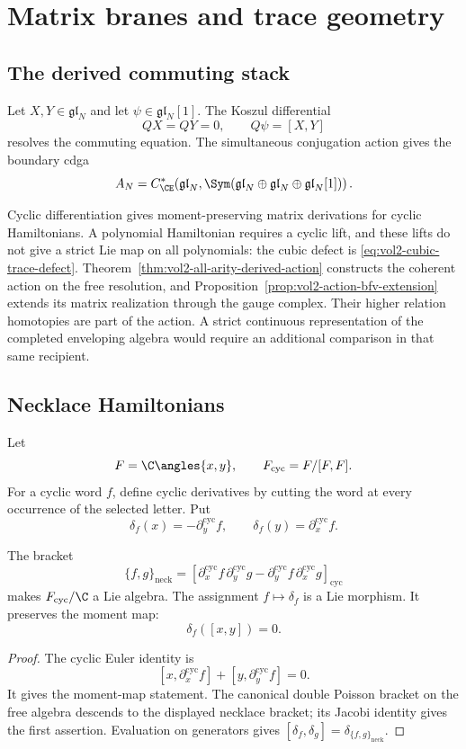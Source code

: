 \part{Matrix branes and trace geometry}

\chapter{The derived commuting stack}
Let $X,Y\in\mathfrak{gl}_N$ and let $\psi\in\mathfrak{gl}_N[1]$.  The Koszul differential
\[
 QX=QY=0,
 \qquad
 Q\psi=[X,Y]
\]
resolves the commuting equation.  The simultaneous conjugation action gives the boundary cdga
\[
 A_N=C^*_{\CE}\!\left(
 \mathfrak{gl}_N,
 \Sym(\mathfrak{gl}_N\oplus\mathfrak{gl}_N\oplus\mathfrak{gl}_N[1])
 \right).
\]

Cyclic differentiation gives moment-preserving matrix derivations for
cyclic Hamiltonians. A polynomial Hamiltonian requires a cyclic lift,
and these lifts do not give a strict Lie map on all polynomials:
the cubic defect is \eqref{eq:vol2-cubic-trace-defect}.
Theorem~\ref{thm:vol2-all-arity-derived-action} constructs the
coherent action on the free resolution, and
Proposition~\ref{prop:vol2-action-bfv-extension} extends its matrix
realization through the gauge complex. Their higher relation
homotopies are part of the action. A strict continuous representation
of the completed enveloping algebra would require an additional
comparison in that same recipient.

\chapter{Necklace Hamiltonians}
Let
\[
 F=\C\angles{x,y},
 \qquad
 F_{\mathrm{cyc}}=F/[F,F].
\]
For a cyclic word $f$, define cyclic derivatives by cutting the word at every occurrence of the selected letter.  Put
\[
 \delta_f(x)=-\partial_y^{\mathrm{cyc}}f,
 \qquad
 \delta_f(y)=\partial_x^{\mathrm{cyc}}f.
\]

\begin{theorem}
The bracket
\[
 \{f,g\}_{\mathrm{neck}}
 =\left[
 \partial_x^{\mathrm{cyc}}f\,
 \partial_y^{\mathrm{cyc}}g-
 \partial_y^{\mathrm{cyc}}f\,
 \partial_x^{\mathrm{cyc}}g
 \right]_{\mathrm{cyc}}
\]
makes $F_{\mathrm{cyc}}/\C$ a Lie algebra.  The assignment $f\mapsto\delta_f$ is a Lie morphism.  It preserves the moment map:
\[
 \delta_f([x,y])=0.
\]
\end{theorem}
\begin{proof}
The cyclic Euler identity is
\[
 [x,\partial_x^{\mathrm{cyc}}f]+[y,\partial_y^{\mathrm{cyc}}f]=0.
\]
It gives the moment-map statement.  The canonical double Poisson bracket on the free algebra descends to the displayed necklace bracket; its Jacobi identity gives the first assertion.  Evaluation on generators gives $[\delta_f,\delta_g]=\delta_{\{f,g\}_{\mathrm{neck}}}$.
\end{proof}

